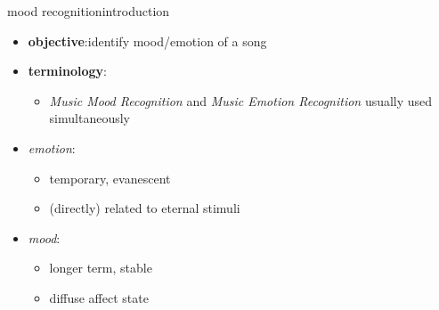         \begin{frame}{mood recognition}{introduction}
            
            \begin{itemize}
                \item	\textbf{objective}:identify mood/emotion of a song
                \item<2->   \textbf{terminology}:
                    \begin{itemize}
                        \item \textit{Music Mood Recognition} and \textit{Music Emotion Recognition} usually used simultaneously
                    \end{itemize}
            \end{itemize}
            
            \begin{itemize}
                \item	\textit{emotion}: 
                    \begin{itemize}
                        \item   temporary, evanescent
                        \item   (directly) related to eternal stimuli
                    \end{itemize}
                \item	\textit{mood}: 
                    \begin{itemize}
                        \item   longer term, stable
                        \item   diffuse affect state
                    \end{itemize}
            \end{itemize}
        \end{frame}
            
